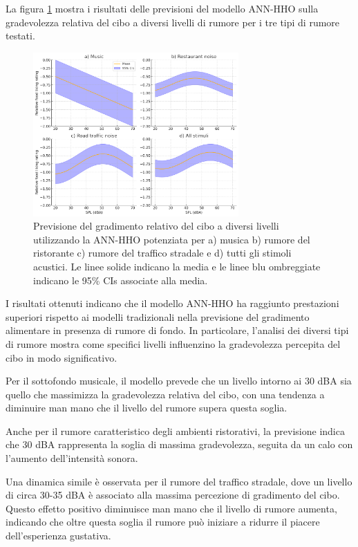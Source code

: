 La figura \ref{fig:prediction_food} mostra i risultati delle previsioni del modello ANN-HHO sulla gradevolezza relativa del cibo a diversi livelli di rumore per i tre tipi di rumore testati.

\begin{figure}[H]
      \centering
      \includegraphics[width=0.7\textwidth]{Chapters/Figures/prediction_food.png}
      \caption{\small Previsione del gradimento relativo del cibo a diversi livelli utilizzando la ANN-HHO potenziata per a) musica b) rumore del ristorante c) rumore del traffico stradale e d) tutti gli stimoli acustici. Le linee solide indicano la media e le linee blu ombreggiate indicano le 95{\%} CIs associate alla media.}
      \label{fig:prediction_food}
\end{figure}

I risultati ottenuti indicano che il modello ANN-HHO ha raggiunto prestazioni superiori rispetto ai modelli tradizionali nella previsione del gradimento alimentare in presenza di rumore di fondo. In particolare, l'analisi dei diversi tipi di rumore mostra come specifici livelli influenzino la gradevolezza percepita del cibo in modo significativo.

Per il sottofondo musicale, il modello prevede che un livello intorno ai 30 dBA sia quello che massimizza la gradevolezza relativa del cibo, con una tendenza a diminuire man mano che il livello del rumore supera questa soglia.

Anche per il rumore caratteristico degli ambienti ristorativi, la previsione indica che 30 dBA rappresenta la soglia di massima gradevolezza, seguita da un calo con l'aumento dell'intensità sonora.

Una dinamica simile è osservata per il rumore del traffico stradale, dove un livello di circa 30-35 dBA è associato alla massima percezione di gradimento del cibo. Questo effetto positivo diminuisce man mano che il livello di rumore aumenta, indicando che oltre questa soglia il rumore può iniziare a ridurre il piacere dell'esperienza gustativa.

